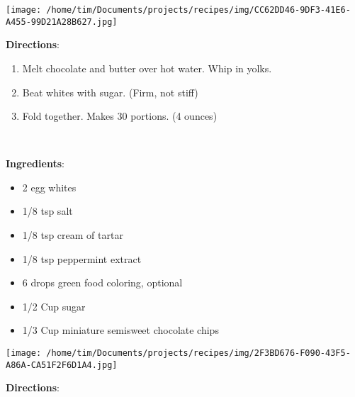 \documentclass[11pt, twoside, openany]{book}
\begin{document}
\begin{minipage}[t]{0.2\linewidth}
\centering \strut\vspace*{-\baselineskip}\newline
\texttt{[image: /home/tim/Documents/projects/recipes/img/CC62DD46-9DF3-41E6-A455-99D21A28B627.jpg]}\\
\end{minipage}\vspace{3mm}
\textbf{Directions}:
\vspace{-3mm}\begin{enumerate}\setlength\itemsep{-1mm}
\item Melt chocolate and butter over hot water. Whip in yolks.
\item Beat whites with sugar. (Firm, not stiff)
\item Fold together. Makes 30 portions. (4 ounces)
\end{enumerate}
 \label{mint-meringues-recipe}\hfill\textit{}\\
\begin{minipage}[t]{0.8\linewidth}
\textbf{Ingredients}:\vspace{-3mm}
\begin{multicols}{2}
\begin{itemize}\setlength\itemsep{-1mm}
\item 2 egg whites
\item 1/8 tsp salt
\item 1/8 tsp cream of tartar
\item 1/8 tsp peppermint extract
\item 6 drops green food coloring, optional
\item 1/2 Cup sugar
\item 1/3 Cup miniature semisweet chocolate chips
\end{itemize}
\end{multicols}
\end{minipage}
\begin{minipage}[t]{0.2\linewidth}
\centering \strut\vspace*{-\baselineskip}\newline
\texttt{[image: /home/tim/Documents/projects/recipes/img/2F3BD676-F090-43F5-A86A-CA51F2F6D1A4.jpg]}\\
\end{minipage}\vspace{3mm}
\textbf{Directions}:
\end{document}
